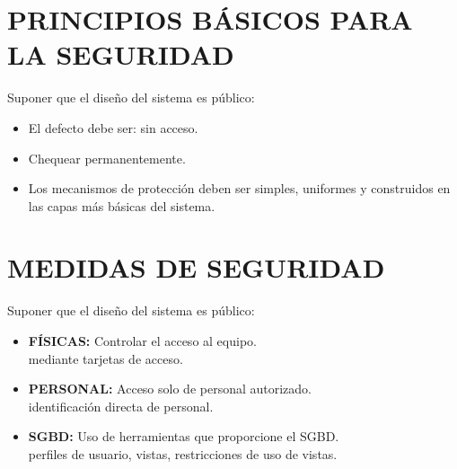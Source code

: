 \documentclass[conference]{IEEEtran}
\begin{document}
\section{PRINCIPIOS BÁSICOS PARA LA SEGURIDAD}

Suponer que el diseño del sistema es público:
\begin{itemize}
\item \textbf{} El defecto debe ser: sin acceso.
\item \textbf{} Chequear permanentemente.
\item \textbf{} Los mecanismos de protección deben ser simples, uniformes y construidos en las capas más básicas del sistema.
\end{itemize}

\section{MEDIDAS DE SEGURIDAD}

Suponer que el diseño del sistema es público:
\begin{itemize}
\item \textbf{FÍSICAS:} Controlar el acceso al equipo.
\\
mediante tarjetas de acceso.
\item \textbf{PERSONAL:} Acceso solo de personal autorizado.
\\
identificación directa de personal.
\item \textbf{SGBD:} Uso de herramientas que proporcione el SGBD.
\\
perfiles de usuario, vistas, restricciones de uso de vistas.
\\
\end{itemize}
\\
\end{document}
